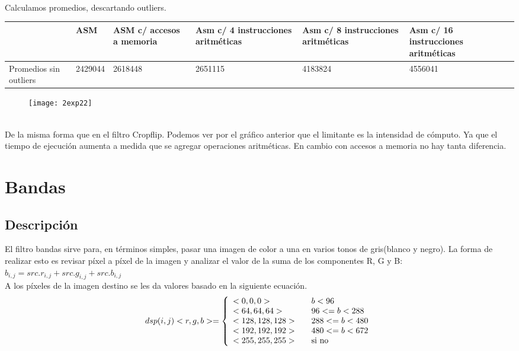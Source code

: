 ﻿\documentclass[a4paper]{article}
\begin{document}
\ \\
Calculamos promedios, descartando outliers. \\

\begin{center}
  \begin{tabular}{| p{2cm} | p{2cm} | p{2cm} | p{2cm} | p{2cm} | p{2cm} |}
    \hline
      & ASM & ASM c/ accesos a memoria  &Asm c/ 4 instrucciones aritméticas & Asm c/ 8 instrucciones aritméticas & Asm c/ 16 instrucciones aritméticas \\
      \hline\hline
      Promedios sin outliers & 2429044 & 2618448 & 2651115 & 4183824 & 4556041 \\
      \hline

  \end{tabular}
\end{center}


\begin{figure}[h]
  \centering
    \texttt{[image: 2exp22]}
\end{figure}

\ \\
De la misma forma que en el filtro Cropflip. Podemos ver por el gráfico anterior que el limitante es la intensidad de cómputo. Ya que 
el tiempo de ejecución aumenta a medida que se agregar operaciones aritméticas. En cambio con accesos a memoria no hay tanta diferencia.


\section{Bandas}
\subsection{Descripci\'on}

	El filtro bandas sirve para, en términos simples, pasar una imagen de color a una en varios tonos de gris(blanco y negro). La forma de realizar esto es revisar píxel a píxel de la imagen y analizar el valor de la suma de los componentes R, G y B:
\ \\	
$b_{i,j}=src.r_{i,j}+src.g_{i,j}+src.b_{i,j}$
\ \\
A los píxeles de la imagen destino se les da valores basado en la siguiente ecuaci\'on. 
\ \\
\[ dsp(i,j) <r,g,b> = \left\{ 
  \begin{array}{l l}
    <0,0,0> & \quad \text{$b<96$}\\
    <64,64,64>  & \quad \text{$96<=b<288$}\\
    <128,128,128>  & \quad \text{$288<=b<480$}\\
    <192,192,192>  & \quad \text{$480<=b<672$}\\
    <255,255,255>  & \quad \text{si no}
  \end{array} \right.\]
\end{document}
